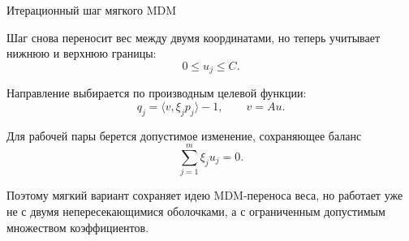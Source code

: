 \SPBGContentSlide
  {Итерационный шаг мягкого MDM}
  {%
    \FormulaBody
    Шаг снова переносит вес между двумя координатами, но теперь учитывает
    нижнюю и верхнюю границы:
    \[
      0\leq u_j\leq C.
    \]

    Направление выбирается по производным целевой функции:
    \[
      q_j=\langle v,\xi_jp_j\rangle-1,
      \qquad
      v=Au.
    \]

    Для рабочей пары берется допустимое изменение, сохраняющее баланс
    \[
      \sum_{j=1}^{m}\xi_j u_j=0.
    \]

    \Body
    Поэтому мягкий вариант сохраняет идею MDM-переноса веса, но работает
    уже не с двумя непересекающимися оболочками, а с ограниченным
    допустимым множеством коэффициентов.
  }

